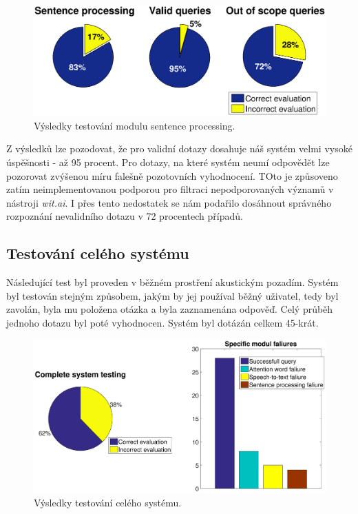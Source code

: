 \documentclass[12pt,a4paper]{article}
\begin{document}
\begin{figure}[ht]
	\begin{center}
		\includegraphics[width = 1\textwidth ]{sentence.eps}
		\caption{Výsledky testování modulu sentence processing.}
		\label{fig:sentence_processing}
	\end{center}
\end{figure}

Z výsledků lze pozodovat, že pro validní dotazy dosahuje náš systém velmi vysoké úspěšnosti - až 95 procent. Pro dotazy, na které systém neumí odpovědět lze pozorovat zvýšenou míru falešně pozotovních vyhodnocení. TOto je způsoveno zatím neimplementovanou podporou pro filtraci nepodporovaných významů v nástroji \textit{wit.ai}. I přes tento nedostatek se nám podařilo dosáhnout správného rozpoznání nevalidního dotazu v 72 procentech případů.

\subsection{Testování celého systému}
Následující test byl proveden v běžném prostření akustickým pozadím. Systém byl testován stejným způsobem, jakým by jej používal běžný uživatel, tedy byl zavolán, byla mu položena otázka a byla zaznamenána odpověď. Celý průběh jednoho dotazu byl poté vyhodnocen. Systém byl dotázán celkem 45-krát.

\begin{figure}[ht]
	\begin{center}
		\includegraphics[width = 1\textwidth ]{full.eps}
		\caption{Výsledky testování celého systému.}
		\label{fig:full}
	\end{center}
\end{figure}
\end{document}
